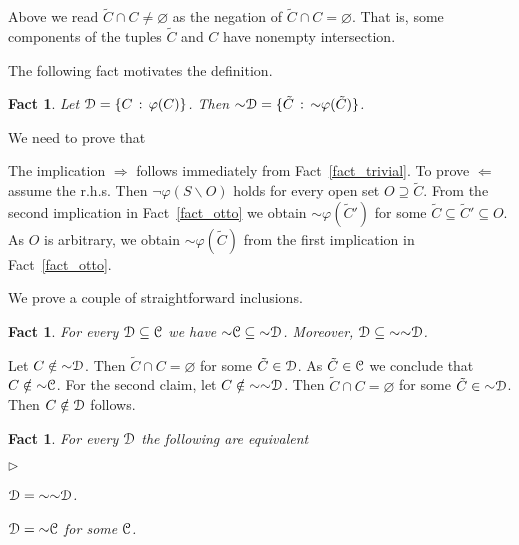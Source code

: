\documentclass{amsproc}
\makeatletter
\newcommand{\mylabel}[1]{{#1}\hfill}
\renewenvironment{itemize}
  {\begin{list}{$\triangleright$}{%
  \setlength{\parskip}{0mm}
  \setlength{\topsep}{.1\baselineskip}
  \setlength{\rightmargin}{0mm}
  \setlength{\listparindent}{0mm}
  \setlength{\itemindent}{0mm}
  \setlength{\labelwidth}{3ex}
  \setlength{\itemsep}{.1\baselineskip}
  \setlength{\parsep}{.1\baselineskip}
  \setlength{\partopsep}{0mm}
  \setlength{\labelsep}{1ex}
  \setlength{\leftmargin}{\labelwidth+\labelsep}
  \let\makelabel\mylabel}}{%
\end{list}}
\newcounter{thm}
\theoremstyle{mio}
\newtheorem{fact}[thm]{Fact}\tcolorboxenvironment{fact}{mythm}
\providecommand{\proofNameStyle}{\bfseries}
\renewenvironment{proof}[1][\proofname]{\par
  \pushQED{\qed}%
  \normalfont%
  \trivlist
  \item[\hskip\labelsep
        \proofNameStyle
    #1\@addpunct{.}]\ignorespaces
}{%
  \popQED\endtrivlist\@endpefalse
}
\makeatother
\begin{document}
Above we read $\tilde C\cap C\neq\varnothing$ as the negation of $\tilde C\cap C=\varnothing$.
That is, some components of the tuples $\tilde C$ and $C$ have nonempty intersection.

The following fact motivates the definition.

\begin{fact}\label{fact_~definibile}
  Let ${\EuScript D}=\{C\,:\,\varphi(C)\}$.
  Then ${\sim}{\EuScript D}=\{\tilde C\,:\,{\sim}\varphi(\tilde C)\}$.
\end{fact}

\begin{proof}
  We need to prove that 


  The implication $\Rightarrow$ follows immediately from Fact~\ref{fact_trivial}.
  To prove $\Leftarrow$ assume the r.h.s.
  Then $\neg\varphi(S\smallsetminus O)$ holds for every open set  $O\supseteq\tilde C$.
  From the second implication in Fact~\ref{fact_otto} we obtain ${\sim}\varphi(\tilde C')$ for some $\tilde C\subseteq\tilde C'\subseteq O$.
As $O$ is arbitrary, we obtain ${\sim}\varphi(\tilde C)$ from the first implication in Fact~\ref{fact_otto}.
\end{proof}

We prove a couple of straightforward inclusions.

\begin{fact}\label{fact_~inclusione}
  For every ${\EuScript D}\subseteq{\EuScript C}$ we have ${\sim}{\EuScript C}\subseteq{\sim}{\EuScript D}$.  
  Moreover, ${\EuScript D}\subseteq{\sim}{\sim}{\EuScript D}$.
\end{fact}

\begin{proof}
  Let $C\notin{\sim}{\EuScript D}$.
  Then $\tilde C\cap C=\varnothing$ for some $\tilde C\in{\EuScript D}$.
  As  $\tilde C\in{\EuScript C}$ we conclude that  $C\notin{\sim}{\EuScript C}$.
  For the second claim, let $C\notin{\sim}{\sim}{\EuScript D}$.
  Then $\tilde C\cap C=\varnothing$ for some $\tilde C\in{\sim}{\EuScript D}$.
  Then $C\notin{\EuScript D}$ follows.
\end{proof}

\begin{fact}
  For every ${\EuScript D}$ the following are equivalent
  \begin{itemize}
    \item [1.] ${\EuScript D}={\sim}{\sim}{\EuScript D}$.
    \item [2.] ${\EuScript D}={\sim}{\EuScript C}$ for some ${\EuScript C}$.
  \end{itemize}
\end{fact}
  
\end{document}

